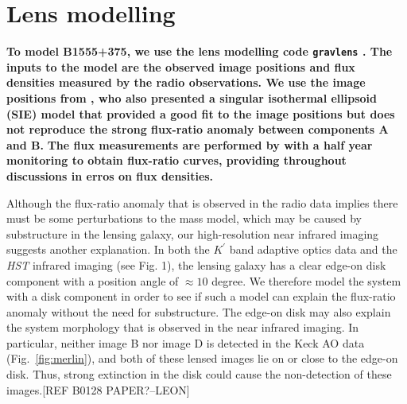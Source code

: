 \documentclass[useAMS,usenatbib]{mnras}
\begin{document}

\section{Lens modelling}

\textbf{To model B1555+375, we use the lens modelling code {\tt gravlens} \citep{Kee01}.  
The inputs to the model are the observed image
positions and flux densities measured by the radio observations.
We use the image positions from \citet{Marlow99}, who also presented a singular isothermal ellipsoid
(SIE) model that provided a good fit to the image positions but
does not reproduce the strong flux-ratio anomaly between components A
and B.}  %
\textbf{The flux measurements are performed by \citet{K03} with a half year monitoring to obtain flux-ratio curves, providing throughout discussions in erros on flux densities.}

Although the flux-ratio anomaly that is observed in the radio data implies there must be some perturbations to the mass model, which may be
caused by substructure in the lensing galaxy, our high-resolution near
infrared imaging suggests another explanation.  In both the $K^\prime$
band adaptive optics data and the \textit{HST} infrared imaging (see 
Fig. 1), the lensing galaxy has a clear edge-on disk component with a
position angle of $\approx 10$ degree.  We therefore model the system
with a disk component in order to see if such a model can explain the
flux-ratio anomaly without the need for substructure.  The edge-on
disk may also explain the system morphology that is observed in the
near infrared imaging.  In particular, neither image B nor image D is
detected in the Keck AO data (Fig.~\ref{fig:merlin}), and both of
these lensed images lie on or close to the edge-on disk.  Thus, strong
extinction in the disk could cause the non-detection of these
images.[REF B0128 PAPER?--LEON]
\end{document}
